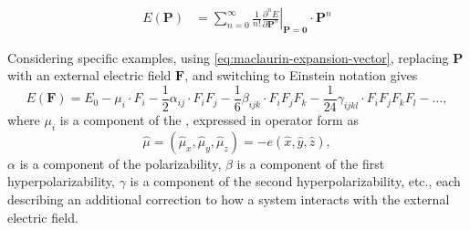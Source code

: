 \documentclass[%
class = book,%
crop = false,%
float = true,%
multi = true,%
preview = false,%
]{standalone}
\begin{document}
\begin{equation}
  \label{eq:maclaurin-expansion-vector}
  \begin{aligned}
    E(\mathbf{P}) &= \sum_{n = 0}^{\infty} \frac{1}{n!} \left. \frac{\partial^{n} E}{\partial \mathbf{P}^{n}} \right|_{\mathbf{P} = \mathbf{0}} \cdot \mathbf{P}^{n}%
  \end{aligned}
\end{equation}

Considering specific examples, using \eqref{eq:maclaurin-expansion-vector}, replacing \(\mathbf{P}\) with an external electric field \(\mathbf{F}\), and switching to Einstein notation gives
\begin{equation}
  \label{eq:electric-field-expansion}
  E(\mathbf{F}) = E_{0} - \mu_{i} \cdot F_{i} - \frac{1}{2} \alpha_{ij} \cdot F_{i}F_{j} - \frac{1}{6} \beta_{ijk} \cdot F_{i}F_{j}F_{k} - \frac{1}{24} \gamma_{ijkl} \cdot F_{i}F_{j}F_{k}F_{l} - \dots,
\end{equation}
where \(\mu_{i}\) is a component of the \href{https://chemistry.stackexchange.com/a/74733/194}{\color{black}{dipole (moment)}}, expressed in operator form as
\begin{equation}
  \label{eq:dipole-operator}
  \hat{\mu} = (\hat{\mu}_{x}, \hat{\mu}_{y}, \hat{\mu}_{z}) = -e(\hat{x}, \hat{y}, \hat{z}),
\end{equation}
\(\alpha\) is a component of the polarizability, \(\beta\) is a component of the first hyperpolarizability, \(\gamma\) is a component of the second hyperpolarizability, etc., each describing an additional correction to how a system interacts with the external electric field.
\end{document}
